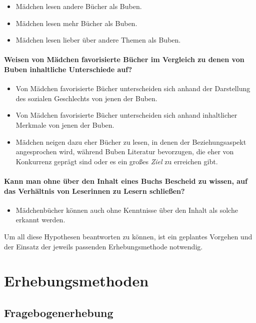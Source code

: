 \begin{itemize}
\item
  Mädchen lesen andere Bücher als Buben.
\item
  Mädchen lesen mehr Bücher als Buben.
\item
  Mädchen lesen lieber über andere Themen als Buben.
\end{itemize}

\paragraph{Weisen von Mädchen favorisierte Bücher im Vergleich zu denen
von Buben inhaltliche Unterschiede auf?}

\begin{itemize}
\item
  Von Mädchen favorisierte Bücher unterscheiden sich anhand der
  Darstellung des sozialen Geschlechts von jenen der Buben.
\item
  Von Mädchen favorisierte Bücher unterscheiden sich anhand inhaltlicher
  Merkmale von jenen der Buben.
\item
  Mädchen neigen dazu eher Bücher zu lesen, in denen der
  Beziehungsaspekt angesprochen wird, während Buben Literatur
  bevorzugen, die eher von Konkurrenz geprägt sind oder es ein großes
  \emph{Ziel} zu erreichen gibt.
\end{itemize}

\paragraph{Kann man ohne über den Inhalt eines Buchs Bescheid zu wissen,
auf das Verhältnis von Leserinnen zu Lesern schließen?}

\begin{itemize}
\item
  Mädchenbücher können auch ohne Kenntnisse über den Inhalt als solche
  erkannt werden.
\end{itemize}

Um all diese Hypothesen beantworten zu können, ist ein geplantes
Vorgehen und der Einsatz der jeweils passenden Erhebungsmethode
notwendig.

\section{Erhebungsmethoden}

\subsection{Fragebogenerhebung}


